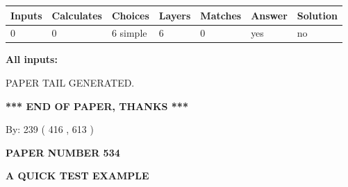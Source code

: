 \documentclass[12pt]{article}
\begin{document}
 
\noindent{}
 
 
   
   
   
   
\noindent\begin{tabular}{|l|l|l|l|l|l|l|}
 \hline
Inputs & Calculates & Choices & Layers & Matches & Answer & Solution \\ \hline
 0  & 
 0  & 
 6
  simple  
  & 
 6  & 
 0  & 
  yes & 
  no 
  \\ \hline
 \end{tabular}
   
   
   
   
\noindent{}
   
   
   
   
\noindent\vspace{0.1in}\hspace{-0.08in} {\textbf{\Large{All inputs: }}}
   
   
   
   
   
   
 \vspace{0.2in}
 
   
   
\vspace{2.0in} PAPER TAIL GENERATED.
   
   
   
   
\vspace{1.0in} 
{\textbf{\large{ *** END OF PAPER, THANKS *** }}} 
   
   
\hspace{1.0in} By: 
 239 ( 416 ,  613 )
   
   
   
   
\newpage 
\setcounter{page}{ 
   534001 } 
   
   
   
   
 {\textbf{ \Large{ PAPER NUMBER  534  }}}
   
   
\vspace{0.2in}
   
   
   
   
   
   
   
   
 \vspace{0.2in}
{\LARGE {\textbf{ A QUICK TEST EXAMPLE}}}
   
\end{document}
